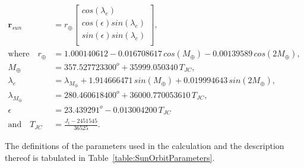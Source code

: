 \begin{equation}
\label{eq:sunPosition}
	\begin{aligned}
		\mathbf{r}_{sun} &= r_{\oplus} \begin{bmatrix}
		cos(\lambda_e) \\ cos(\epsilon)sin(\lambda_e) \\ sin(\epsilon)sin(\lambda_e) \\
		\end{bmatrix}, \\
		\text{where} \quad r_{\oplus} &= \num{1.000140612} - \num{0.016708617} \, cos(M_{\oplus}) - \num{0.00139589} \, cos(2M_{\oplus}), \\
		M_{\oplus} &= \num{357.527723300}^o + \num{35999.050340} \, T_{JC}, \\
		\lambda_e &= \lambda_{M_{\oplus}} + \num{1.914666471} \, sin(M_{\oplus}) + \num{0.019994643} \, sin(2M_{\oplus}), \\
		\lambda_{M_{\oplus}} &= \num{280.460618400}^o + \num{36000.770053610} \, T_{JC}, \\
		\epsilon &= \num{23.439291}^o - \num{0.013004200} \, T_{JC} \\
		\text{and} \quad T_{JC} &= \frac{J_t - \num{2451545}}{\num{36525}}.
	\end{aligned}
\end{equation}

The definitions of the parameters used in the calculation and the description thereof is tabulated in Table~\ref{table:SunOrbitParameters}.


